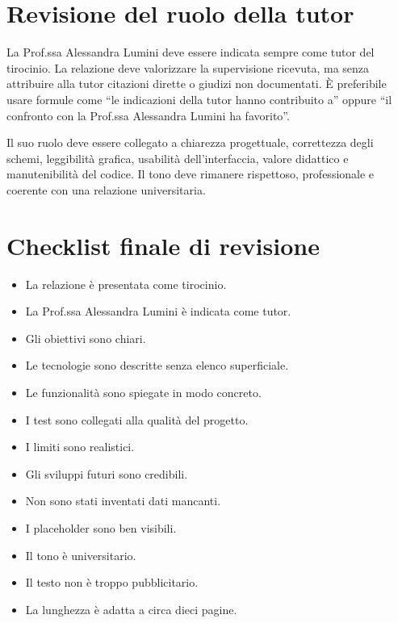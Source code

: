 \section{Revisione del ruolo della tutor}

La Prof.ssa Alessandra Lumini deve essere indicata sempre come tutor del tirocinio. La relazione deve valorizzare la supervisione ricevuta, ma senza attribuire alla tutor citazioni dirette o giudizi non documentati. È preferibile usare formule come ``le indicazioni della tutor hanno contribuito a'' oppure ``il confronto con la Prof.ssa Alessandra Lumini ha favorito''.

Il suo ruolo deve essere collegato a chiarezza progettuale, correttezza degli schemi, leggibilità grafica, usabilità dell'interfaccia, valore didattico e manutenibilità del codice. Il tono deve rimanere rispettoso, professionale e coerente con una relazione universitaria.

\section{Checklist finale di revisione}

\begin{itemize}
    \item[$\square$] La relazione è presentata come tirocinio.
    \item[$\square$] La Prof.ssa Alessandra Lumini è indicata come tutor.
    \item[$\square$] Gli obiettivi sono chiari.
    \item[$\square$] Le tecnologie sono descritte senza elenco superficiale.
    \item[$\square$] Le funzionalità sono spiegate in modo concreto.
    \item[$\square$] I test sono collegati alla qualità del progetto.
    \item[$\square$] I limiti sono realistici.
    \item[$\square$] Gli sviluppi futuri sono credibili.
    \item[$\square$] Non sono stati inventati dati mancanti.
    \item[$\square$] I placeholder sono ben visibili.
    \item[$\square$] Il tono è universitario.
    \item[$\square$] Il testo non è troppo pubblicitario.
    \item[$\square$] La lunghezza è adatta a circa dieci pagine.
\end{itemize}
